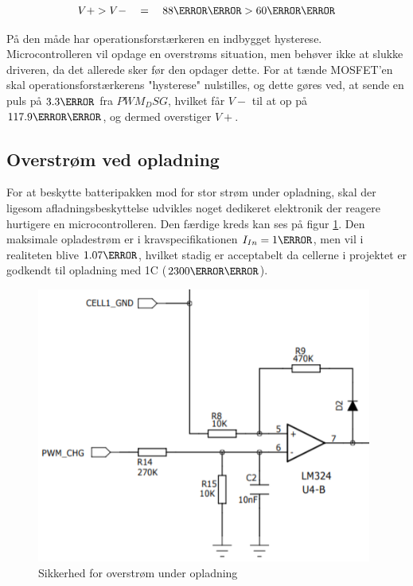 \begin {equation} 
V+ > V- \quad = \quad 88\milli\volt > 60\milli\volt
\end {equation}

På den måde har operationsforstærkeren en indbygget hysterese.
Microcontrolleren vil opdage en overstrøms situation, men behøver ikke at slukke driveren, da det allerede sker før den opdager dette. For at tænde MOSFET'en skal operationsforstærkerens "hysterese" nulstilles, og dette gøres ved, at sende en puls på $3.3\volt$ fra $PWM_DSG$, hvilket får $V-$ til at op på $117.9\milli\volt$, og dermed overstiger $V+$.


\subsection{Overstrøm ved opladning}\label{sec:overcurrent_chg}
For at beskytte batteripakken mod for stor strøm under opladning, skal der ligesom afladningsbeskyttelse udvikles noget dedikeret elektronik der reagere hurtigere en microcontrolleren. Den færdige kreds kan ses på figur \ref{fig:overcurrent_charge}. Den maksimale opladestrøm er i kravspecifikationen $I_{In}=1\ampere$, men vil i realiteten blive $1.07\ampere$, hvilket stadig er acceptabelt da cellerne i projektet er godkendt til opladning med 1C ($2300\milli\ampere$).
\\

\begin{figure}[h]
	\centering
	\includegraphics[width=11cm]{billeder/overcurrent_charge.png}
	\caption{Sikkerhed for overstrøm under opladning}
	\label{fig:overcurrent_charge}
\end{figure}

